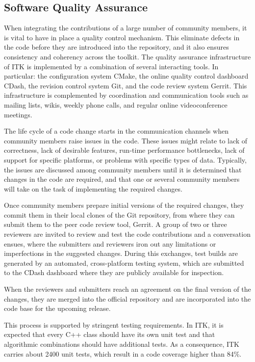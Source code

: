\documentclass{frontiersENG} %
\begin{document}
\subsection{Software Quality Assurance}

When integrating the contributions of a large number of community members, it
is vital to have in place a quality control mechanism. This eliminate defects
in the code before they are introduced into the repository, and it also ensures
consistency and coherency across the toolkit.  The quality assurance
infrastructure of ITK is implemented by a combination of several interacting
tools. In particular: the configuration system CMake, the online quality
control dashboard CDash, the revision control system Git, and the code review
system Gerrit. This infrastructure is complemented by coordination and
communication tools such as mailing lists, wikis, weekly phone calls, and
regular online videoconference meetings.

The life cycle of a code change starts in the communication channels when
community members raise issues in the code. These issues might relate to lack
of correctness, lack of desirable features, run-time performance
bottlenecks, lack of support for specific platforms, or problems with specific
types of data. Typically, the issues are discussed among community members
until it is determined that changes in the code are required, and that one or
several community members will take on the task of implementing the required
changes.

Once community members prepare initial versions of the required changes, they
commit them in their local clones of the Git repository, from where they can
submit them to the peer code review tool, Gerrit. A group of two or three
reviewers are invited to review and test the code contributions and a
conversation ensues, where the submitters and reviewers iron out any
limitations or imperfections in the suggested changes. During this exchanges,
test builds are generated by an automated, cross-platform testing system, which
are submitted to the CDash dashboard where they are publicly available for
inspection.

When the reviewers and submitters reach an agreement on the final version of
the changes, they are merged into the official repository and are incorporated
into the code base for the upcoming release.

This process is supported by stringent testing requirements. In ITK, it is
expected that every C++ class should have its own unit test and that
algorithmic combinations should have additional tests. As a consequence, ITK
carries about 2400 unit tests, which result in a code coverage
higher than 84\%.
\end{document}
